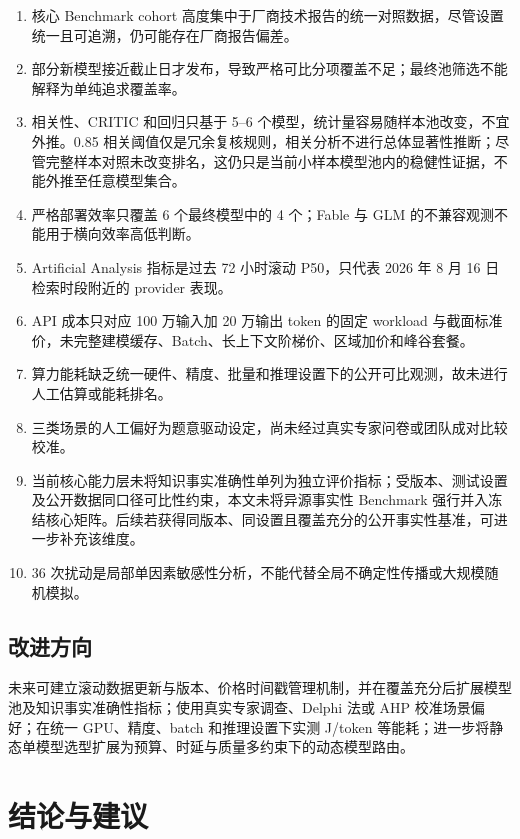 \documentclass[UTF8,zihao=-4,a4paper,fontset=none]{ctexart}
\begin{document}
\begin{enumerate}[label=(\arabic*),leftmargin=3em]
  \item 核心 Benchmark cohort 高度集中于厂商技术报告的统一对照数据，尽管设置统一且可追溯，仍可能存在厂商报告偏差。
  \item 部分新模型接近截止日才发布，导致严格可比分项覆盖不足；最终池筛选不能解释为单纯追求覆盖率。
  \item 相关性、CRITIC 和回归只基于 5--6 个模型，统计量容易随样本池改变，不宜外推。0.85 相关阈值仅是冗余复核规则，相关分析不进行总体显著性推断；尽管完整样本对照未改变排名，这仍只是当前小样本模型池内的稳健性证据，不能外推至任意模型集合。
  \item 严格部署效率只覆盖 6 个最终模型中的 4 个；Fable 与 GLM 的不兼容观测不能用于横向效率高低判断。
  \item Artificial Analysis 指标是过去 72 小时滚动 P50，只代表 2026 年 8 月 16 日检索时段附近的 provider 表现。
  \item API 成本只对应 100 万输入加 20 万输出 token 的固定 workload 与截面标准价，未完整建模缓存、Batch、长上下文阶梯价、区域加价和峰谷套餐。
  \item 算力能耗缺乏统一硬件、精度、批量和推理设置下的公开可比观测，故未进行人工估算或能耗排名。
  \item 三类场景的人工偏好为题意驱动设定，尚未经过真实专家问卷或团队成对比较校准。
  \item 当前核心能力层未将知识事实准确性单列为独立评价指标；受版本、测试设置及公开数据同口径可比性约束，本文未将异源事实性 Benchmark 强行并入冻结核心矩阵。后续若获得同版本、同设置且覆盖充分的公开事实性基准，可进一步补充该维度。
  \item 36 次扰动是局部单因素敏感性分析，不能代替全局不确定性传播或大规模随机模拟。
\end{enumerate}

\subsection{改进方向}

未来可建立滚动数据更新与版本、价格时间戳管理机制，并在覆盖充分后扩展模型池及知识事实准确性指标；使用真实专家调查、Delphi 法或 AHP 校准场景偏好；在统一 GPU、精度、batch 和推理设置下实测 J/token 等能耗；进一步将静态单模型选型扩展为预算、时延与质量多约束下的动态模型路由。

\section{结论与建议}
\end{document}
